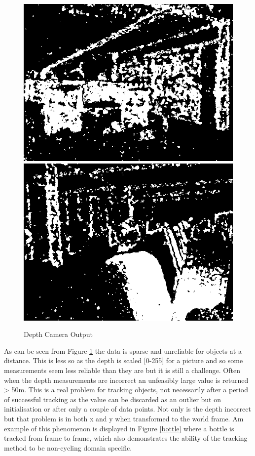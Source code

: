 \documentclass[11pt,twoside]{report}
\begin{document}
\noindent \begin{figure}[h!]
	\includegraphics[width = 0.5\hsize]{figures/depth_image_1.png}
	\includegraphics[width = 0.5\hsize]{figures/depth_image_2.png}
	\caption{Depth Camera Output}
	\label{DCO}
\end{figure}

As can be seen from Figure \ref{DCO} the data is sparse and unreliable for objects at a distance. This is less so as the depth is scaled [0-255] for a picture and so some measurements seem less reliable than they are but it is still a challenge. Often when the depth measurements are incorrect an unfeasibly large value is returned > 50m. This is a real problem for tracking objects, not necessarily after a period of successful tracking as the value can be discarded as an outlier but on initialisation or after only a couple of data points. Not only is the depth incorrect but that problem is in both x and y when transformed to the world frame. Am example of this phenomenon is displayed in Figure \ref{bottle} where a bottle is tracked from frame to frame, which also demonstrates the ability of the tracking method to be non-cycling domain specific.
\end{document}

